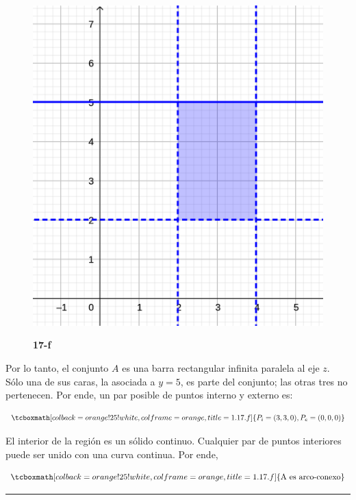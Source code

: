 \documentclass{article}
\begin{document}
\begin{figure}[ht]
\caption{\textbf{17-f}}
\includegraphics[scale=0.7]{img/ejercicios/1/17-f.png} 
\centering
\label{fig:1-17-f}
\end{figure}

Por lo tanto, el conjunto $A$ es una barra rectangular infinita paralela al eje $z$. Sólo una de sus caras, la asociada a $y = 5$, es parte del conjunto; las otras tres no pertenecen. Por ende, un par posible de puntos interno y externo es:

\begin{equation}
\tcboxmath[colback=orange!25!white,colframe=orange,title=1.17.f]
{
P_i = (3, 3, 0), P_e = (0, 0, 0)
}
\end{equation}

El interior de la región es un sólido continuo. Cualquier par de puntos interiores puede ser unido con una curva continua. Por ende,

\begin{equation}
\tcboxmath[colback=orange!25!white,colframe=orange,title=1.17.f]
{ \text{A es arco-conexo} }
\end{equation}

\hrule
\vspace{10 pt}
\end{document}

